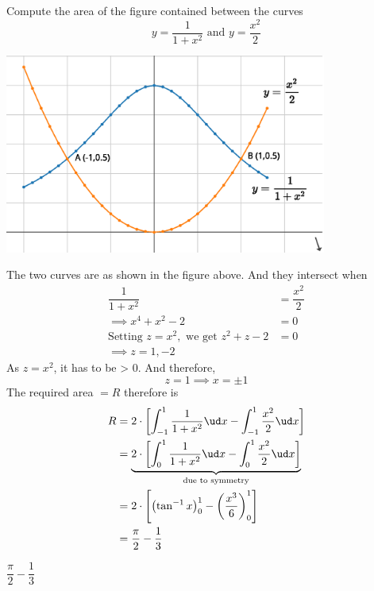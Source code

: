 

\question[3] Compute the area of the figure contained between the curves
\[ y = \dfrac{1}{1+x^2}\text{ and } y=\dfrac{x^2}{2} \]

\ifprintanswers
  \vspace{0.3cm}
  \includegraphics[width=300pt]{plotly.eps}
\fi

\begin{solution}[\fullpage]
	The two curves are as shown in the figure above. And they intersect when
  \begin{align}
     \dfrac{1}{1+x^2} &= \dfrac{x^2}{2} \\
     \implies x^4+x^2-2 &= 0 \\
     \text{Setting } z = x^2, \text{ we get }
     z^2+z-2 &= 0 \\
     \implies z = 1, -2
  \end{align}
  As $z = x^2$, it has to be > 0. And therefore, 
	\[ z = 1 \implies x = \pm 1 \]
	The required area $=R$ therefore is 
  \begin{align}
     R &= 2\cdot\left[ \int_{-1}^1 \dfrac{1}{1+x^2}\ud x - \int_{-1}^1\dfrac{x^2}{2}\ud x\right] \\
       &= \underbrace{2\cdot\left[ \int_0^1 \dfrac{1}{1+x^2}\ud x - \int_0^1\dfrac{x^2}{2}\ud x\right]}_{\text{due to symmetry}} \\
     &= 2\cdot\left[ \left( \tan^{-1} x\right)_0^1 - \left( \dfrac{x^3}{6}\right)_0^1\right] \\
     &= \dfrac{\pi}{2} - \dfrac{1}{3} 
  \end{align}
\end{solution}
\ifprintanswers\begin{codex}$\dfrac\pi{2}-\dfrac{1}{3}$\end{codex}\fi
